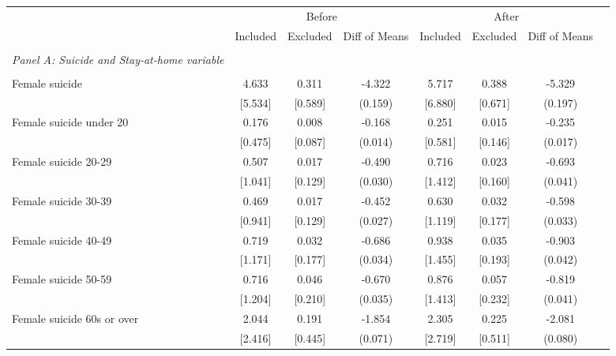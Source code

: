 \begin{tabular}{l*{7}{c}} \toprule
                    &\multicolumn{3}{c}{Before}            &\multicolumn{3}{c}{After}             \\\cmidrule(lr){2-4}\cmidrule(lr){5-7}
                    &\multicolumn{1}{c}{Included}&\multicolumn{1}{c}{Excluded}&\multicolumn{1}{c}{Diff of Means}&\multicolumn{1}{c}{Included}&\multicolumn{1}{c}{Excluded}&\multicolumn{1}{c}{Diff of Means}\\
\hline \\ \multicolumn{1}{l}{\textit{Panel A: Suicide and Stay-at-home variable}} \\\\[-1ex]
Female suicide      &       4.633&       0.311&      -4.322&       5.717&       0.388&      -5.329\\
                    &     [5.534]&     [0.589]&     (0.159)&     [6.880]&     [0.671]&     (0.197)\\
Female suicide under 20&       0.176&       0.008&      -0.168&       0.251&       0.015&      -0.235\\
                    &     [0.475]&     [0.087]&     (0.014)&     [0.581]&     [0.146]&     (0.017)\\
Female suicide 20-29&       0.507&       0.017&      -0.490&       0.716&       0.023&      -0.693\\
                    &     [1.041]&     [0.129]&     (0.030)&     [1.412]&     [0.160]&     (0.041)\\
Female suicide 30-39&       0.469&       0.017&      -0.452&       0.630&       0.032&      -0.598\\
                    &     [0.941]&     [0.129]&     (0.027)&     [1.119]&     [0.177]&     (0.033)\\
Female suicide 40-49&       0.719&       0.032&      -0.686&       0.938&       0.035&      -0.903\\
                    &     [1.171]&     [0.177]&     (0.034)&     [1.455]&     [0.193]&     (0.042)\\
Female suicide 50-59&       0.716&       0.046&      -0.670&       0.876&       0.057&      -0.819\\
                    &     [1.204]&     [0.210]&     (0.035)&     [1.413]&     [0.232]&     (0.041)\\
Female suicide 60s or over&       2.044&       0.191&      -1.854&       2.305&       0.225&      -2.081\\
                    &     [2.416]&     [0.445]&     (0.071)&     [2.719]&     [0.511]&     (0.080)\\

\end{tabular}
